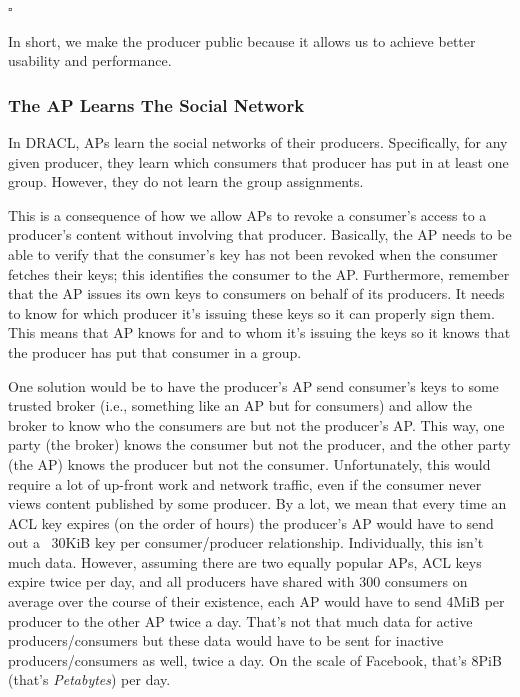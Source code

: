 \documentclass[pdftex,12pt,a4papaer,twoside,notitlepage]{report}
\begin{document}
{\hfill $\square$}

In short, we make the producer public because it allows us to achieve better
usability and performance.

\subsubsection{The AP Learns The Social Network}
\label{sub:ap_learns_network}

In DRACL, APs learn the social networks of their producers. Specifically,
for any given producer, they learn which consumers that producer has put in at
least one group. However, they do not learn the group assignments.

This is a consequence of how we allow APs to revoke a consumer's access to a
producer's content without involving that producer. Basically, the AP needs to
be able to verify that the consumer's key has not been revoked when the consumer
fetches their keys; this identifies the consumer to the AP. Furthermore,
remember that the AP issues its own keys to consumers on behalf of its
producers. It needs to know for which producer it's issuing these keys so it can
properly sign them. This means that AP knows for and to whom it's issuing the
keys so it knows that the producer has put that consumer in a group.

One solution would be to have the producer's AP send consumer's keys to some
trusted broker (i.e., something like an AP but for consumers) and allow the
broker to know who the consumers are but not the producer's AP. This way, one
party (the broker) knows the consumer but not the producer, and the other party
(the AP) knows the producer but not the consumer. Unfortunately, this would
require a lot of up-front work and network traffic, even if the consumer never
views content published by some producer. By a lot, we mean that every time an
ACL key expires (on the order of hours) the producer's AP would have to send out
a ~30KiB key per consumer/producer relationship. Individually, this isn't much
data. However, assuming there are two equally popular APs, ACL keys expire twice
per day, and all producers have shared with 300 consumers on average over the
course of their existence, each AP would have to send 4MiB per producer to the
other AP twice a day. That's not that much data for active producers/consumers
but these data would have to be sent for inactive producers/consumers as well,
twice a day. On the scale of Facebook, that's 8PiB (that's \emph{Petabytes}) per
day.
\end{document}
